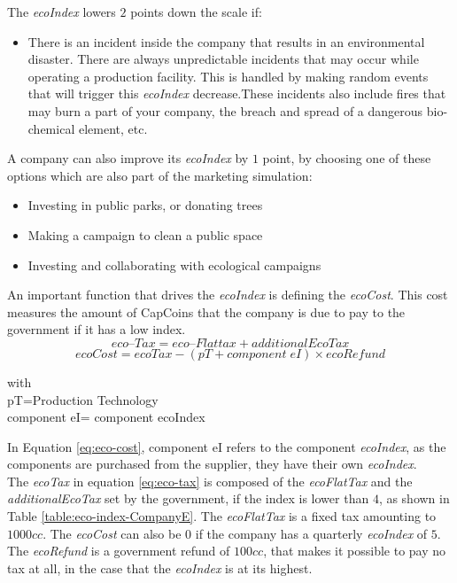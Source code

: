 The \textit{ecoIndex} lowers $2$ points down the scale if: 
\begin{itemize}
	\item There is an incident inside the company that results in an environmental disaster. There are always unpredictable incidents that may occur while operating a production facility. This is handled by making random events that will trigger this \textit{ecoIndex} decrease.These incidents also include fires that may burn a part of your company, the breach and spread of a dangerous bio-chemical element, etc.
\end{itemize}

A company can also improve its \textit{ecoIndex} by $1$ point, by choosing one of these options which are also part of the marketing simulation: 
\begin{itemize}
\item Investing in public parks, or donating trees
\item Making a campaign to clean a public space
\item Investing and collaborating with ecological campaigns
\end{itemize}

An important function that drives the \textit{ecoIndex} is defining the \textit{ecoCost}. This cost measures the amount of CapCoins that the company is due to pay to the government if it has a low index. \\ 
\begin{equation}
eco–Tax= eco–Flat tax+ additionalEcoTax
\label{eq:eco-tax}
\end{equation}
\begin{equation}
ecoCost= ecoTax - (pT + component \; eI)\times ecoRefund 
\label{eq:eco-cost}
\end{equation}
\begin{center}
with\\
	pT=Production Technology\\
	component eI= component ecoIndex\\
\end{center}

In Equation \ref{eq:eco-cost}, component eI refers to the component  \textit{ecoIndex}, as the components are purchased from the supplier, they have their own \textit{ecoIndex}.\\
The \textit{ecoTax} in equation \ref{eq:eco-tax} is composed of the \textit{ecoFlatTax} and the \textit{additionalEcoTax} set by the government, if the index is lower than $4$, as shown in Table \ref{table:eco-index-CompanyE}.
The \textit{ecoFlatTax} is a fixed tax amounting to $1000cc$. The \textit{ecoCost} can also be $0$ if the company has a quarterly  \textit{ecoIndex} of $5$. The  \textit{ecoRefund} is a government refund of $100cc$, that makes it possible to pay no tax at all, in the case that the \textit{ecoIndex} is at its highest. 